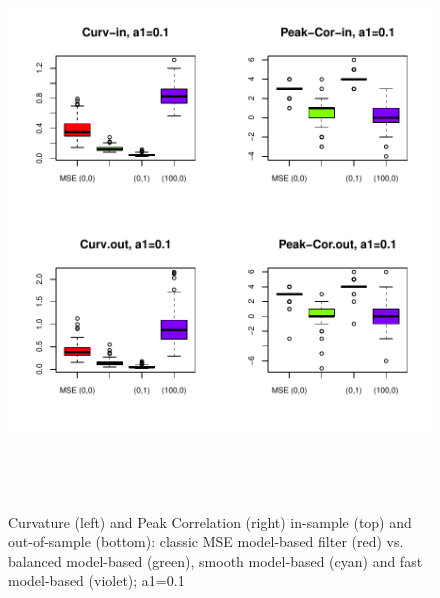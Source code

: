 \documentclass[a4paper]{book}
\begin{document}
\begin{figure}[H]\begin{center}\includegraphics[height=6in, width=6in]{z_replication_curv_peak_dfa_2_emp}\caption{Curvature (left) and Peak Correlation (right) in-sample (top) and out-of-sample (bottom): classic MSE model-based filter (red) vs. balanced model-based (green), smooth model-based (cyan) and fast model-based (violet);  a1=0.1\label{z_replication_curv_peak_dfa_2_emp}}\end{center}\end{figure}
\end{document}
